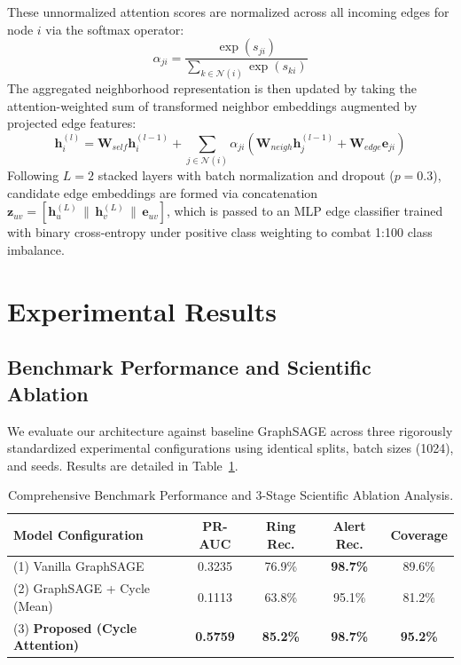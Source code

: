 \documentclass[10pt,twocolumn]{article}
\begin{document}
These unnormalized attention scores are normalized across all incoming edges for node $i$ via the softmax operator:
\begin{equation}
    \alpha_{ji} = \frac{\exp(s_{ji})}{\sum_{k \in \mathcal{N}(i)} \exp(s_{ki})}
    \label{eq:softmax}
\end{equation}
The aggregated neighborhood representation is then updated by taking the attention-weighted sum of transformed neighbor embeddings augmented by projected edge features:
\begin{equation}
    \mathbf{h}_i^{(l)} = \mathbf{W}_{self} \mathbf{h}_i^{(l-1)} + \sum_{j \in \mathcal{N}(i)} \alpha_{ji} \left( \mathbf{W}_{neigh} \mathbf{h}_j^{(l-1)} + \mathbf{W}_{edge} \mathbf{e}_{ji} \right)
    \label{eq:sage_update}
\end{equation}
Following $L=2$ stacked layers with batch normalization and dropout ($p=0.3$), candidate edge embeddings are formed via concatenation $\mathbf{z}_{uv} = [\mathbf{h}_u^{(L)} \,\|\, \mathbf{h}_v^{(L)} \,\|\, \mathbf{e}_{uv}]$, which is passed to an MLP edge classifier trained with binary cross-entropy under positive class weighting to combat 1:100 class imbalance.

\section{Experimental Results}

\subsection{Benchmark Performance and Scientific Ablation}
We evaluate our architecture against baseline GraphSAGE across three rigorously standardized experimental configurations using identical splits, batch sizes (1024), and seeds. Results are detailed in Table~\ref{tab:ablation}.

\begin{table}[ht]
\centering
\caption{Comprehensive Benchmark Performance and 3-Stage Scientific Ablation Analysis.}
\label{tab:ablation}
\small
\renewcommand{\arraystretch}{1.15}
\begin{tabularx}{\columnwidth}{Xcccc}
\toprule
\textbf{Model Configuration} & \textbf{PR-AUC} & \textbf{Ring Rec.} & \textbf{Alert Rec.} & \textbf{Coverage} \\
\midrule
(1) Vanilla GraphSAGE & 0.3235 & 76.9\% & \textbf{98.7\%} & 89.6\% \\
(2) GraphSAGE + Cycle (Mean) & 0.1113 & 63.8\% & 95.1\% & 81.2\% \\
(3) \textbf{Proposed (Cycle Attention)} & \textbf{0.5759} & \textbf{85.2\%} & \textbf{98.7\%} & \textbf{95.2\%} \\
\bottomrule
\end{tabularx}
\end{table}
\end{document}

